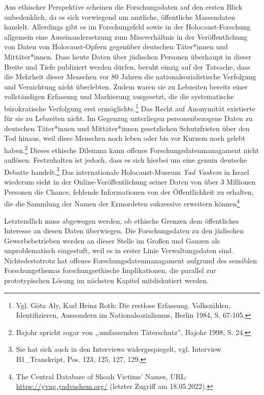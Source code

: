Aus ethischer Perspektive scheinen die Forschungsdaten auf den ersten Blick unbedenklich, da es sich vorwiegend um amtliche, öffentliche Massendaten handelt. Allerdings gibt es im Forschungsfeld sowie in der Holocaust-Forschung allgemein eine Auseinandersetzung zum Missverhältnis in der Veröffentlichung von Daten von Holocaust-Opfern gegenüber deutschen Täter*innen und Mittäter*innen. Dass heute Daten über jüdischen Personen überhaupt in dieser Breite und Tiefe publiziert werden dürfen, beruht einzig auf der Tatsache, dass die Mehrheit dieser Menschen vor 80 Jahren die nationalsozialistische Verfolgung und Vernichtung nicht überlebten. Zudem waren sie zu Lebzeiten bereits einer vollständigen Erfassung und Markierung ausgesetzt, die die systematische bürokratische Verfolgung erst ermöglichte.\footnote{Vgl. Götz Aly, Karl Heinz Roth: Die restlose Erfassung. Volkszählen, Identifizieren, Aussondern im Nationalsozialismus, Berlin 1984, S. 67-105.} Das Recht auf Anonymität existierte für sie zu Lebzeiten nicht. Im Gegenzug unterliegen personenbezogene Daten zu deutschen Täter*innen und Mittäter*innen gesetzlichen Schutzfristen über den Tod hinaus, weil diese Menschen noch leben oder bis vor Kurzem noch gelebt haben.\footnote{Bajohr spricht sogar von ,,umfassenden Täterschutz'', Bajohr 1998, S. 24.} Dieses ethische Dilemma kann offenes Forschungsdatenmanagament nicht auflösen. Festzuhalten ist jedoch, dass es sich hierbei um eine genuin deutsche Debatte handelt.\footnote{Sie hat sich auch in den Interviews widergespiegelt, vgl. Interview B1\_Transkript, Pos. 123, 125, 127, 129.} Das internationale Holocaust-Museum \textit{Yad Vashem} in Israel wiederum sieht in der Online-Veröffentlichung seiner Daten von über 3 Millionen Personen die Chance, fehlende Informationen von der Öffentlichkeit zu erhalten, die die Sammlung der Namen der Ermordeten sukzessive erweitern können\footnote{The Central Database of Shoah Victims' Names, URL: \url{https://yvng.yadvashem.org/} (letzter Zugriff am 18.05.2022).}

Letztendlich muss abgewogen werden, ob ethische Grenzen dem öffentliches Interesse an diesen Daten überwiegen. Die Forschungsdaten zu den jüdischen Gewerbebetrieben werden an dieser Stelle im Großen und Ganzen als unproblematisch eingestuft, weil es in erster Linie Verwaltungsdaten sind. Nichtsdestotrotz hat offenes Forschungsdatenmanagament aufgrund des sensiblen Forschungsthemas forschungsethische Implikationen, die parallel zur prototypischen Lösung im nächsten Kapitel mitdiskutiert werden.




